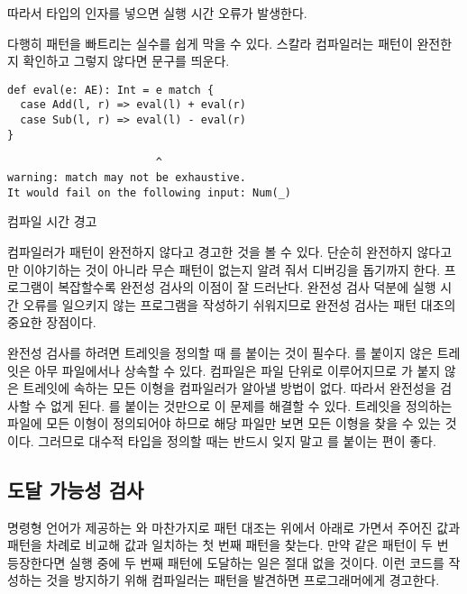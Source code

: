 따라서  타입의 인자를 넣으면 실행 시간 오류가 발생한다.

다행히 패턴을 빠트리는 실수를 쉽게 막을 수 있다. 스칼라 컴파일러는 패턴이
완전한지 확인하고 그렇지 않다면  문구를 띄운다.

\begin{verbatim}
def eval(e: AE): Int = e match {
  case Add(l, r) => eval(l) + eval(r)
  case Sub(l, r) => eval(l) - eval(r)
}
\end{verbatim}
\vspace{-1em}
\begin{mdframed}[hidealllines=true,backgroundcolor=gray!10,innerleftmargin=3pt,innerrightmargin=3pt,leftmargin=-3pt,rightmargin=-3pt]
\begin{verbatim}
                       ^
warning: match may not be exhaustive.
It would fail on the following input: Num(_)
\end{verbatim}
\vspace{-2em}
\begin{flushright}
\scriptsize\textsf{컴파일 시간 경고}
\end{flushright}
\end{mdframed}

컴파일러가 패턴이 완전하지 않다고 경고한 것을 볼 수 있다. 단순히 완전하지
않다고만 이야기하는 것이 아니라 무슨 패턴이 없는지 알려 줘서 디버깅을 돕기까지
한다. 프로그램이 복잡할수록 완전성 검사의 이점이 잘 드러난다. 완전성 검사 덕분에
실행 시간 오류를 일으키지 않는 프로그램을 작성하기 쉬워지므로 완전성 검사는 패턴
대조의 중요한 장점이다.

완전성 검사를 하려면 트레잇을 정의할 때 를 붙이는 것이 필수다.
를 붙이지 않은 트레잇은 아무 파일에서나 상속할 수 있다. 컴파일은
파일 단위로 이루어지므로 가 붙지 않은 트레잇에 속하는 모든 이형을
컴파일러가 알아낼 방법이 없다. 따라서 완전성을 검사할 수 없게 된다.
를 붙이는 것만으로 이 문제를 해결할 수 있다. 트레잇을 정의하는
파일에 모든 이형이 정의되어야 하므로 해당 파일만 보면 모든 이형을 찾을 수 있는
것이다. 그러므로 대수적 타입을 정의할 때는 반드시 잊지 말고 를
붙이는 편이 좋다.

\subsection{도달 가능성 검사}

명령형 언어가 제공하는 와 마찬가지로 패턴 대조는 위에서 아래로
가면서 주어진 값과 패턴을 차례로 비교해 값과 일치하는 첫 번째 패턴을 찾는다.
만약 같은 패턴이 두 번 등장한다면 실행 중에 두 번째 패턴에 도달하는 일은 절대
없을 것이다. 이런 코드를 작성하는 것을 방지하기 위해 컴파일러는  패턴을 발견하면 프로그래머에게 경고한다.

